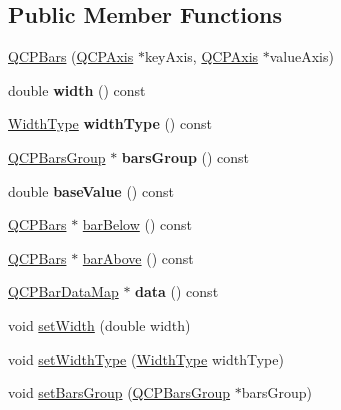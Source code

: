 \subsection*{Public Member Functions}
\begin{DoxyCompactItemize}
\item 
\hyperlink{class_q_c_p_bars_a64006999ad9dff308f40df41cef176ad}{Q\+C\+P\+Bars} (\hyperlink{class_q_c_p_axis}{Q\+C\+P\+Axis} $\ast$key\+Axis, \hyperlink{class_q_c_p_axis}{Q\+C\+P\+Axis} $\ast$value\+Axis)
\item 
\hypertarget{class_q_c_p_bars_abe7eb3987d8711f45829db879aee2280}{}\label{class_q_c_p_bars_abe7eb3987d8711f45829db879aee2280} 
double {\bfseries width} () const
\item 
\hypertarget{class_q_c_p_bars_a4c103fb405a45f47853e0345f0c6e708}{}\label{class_q_c_p_bars_a4c103fb405a45f47853e0345f0c6e708} 
\hyperlink{class_q_c_p_bars_a65dbbf1ab41cbe993d71521096ed4649}{Width\+Type} {\bfseries width\+Type} () const
\item 
\hypertarget{class_q_c_p_bars_a5eef59840b68d205df4e0c3df5f97633}{}\label{class_q_c_p_bars_a5eef59840b68d205df4e0c3df5f97633} 
\hyperlink{class_q_c_p_bars_group}{Q\+C\+P\+Bars\+Group} $\ast$ {\bfseries bars\+Group} () const
\item 
\hypertarget{class_q_c_p_bars_a29a7b3b86f80b2a04bd1f9ec0ebaf422}{}\label{class_q_c_p_bars_a29a7b3b86f80b2a04bd1f9ec0ebaf422} 
double {\bfseries base\+Value} () const
\item 
\hyperlink{class_q_c_p_bars}{Q\+C\+P\+Bars} $\ast$ \hyperlink{class_q_c_p_bars_a1b58664864b141f45e02044a855b3213}{bar\+Below} () const
\item 
\hyperlink{class_q_c_p_bars}{Q\+C\+P\+Bars} $\ast$ \hyperlink{class_q_c_p_bars_ab97f2acd9f6cb40d2cc3c33d278f0e78}{bar\+Above} () const
\item 
\hypertarget{class_q_c_p_bars_a185bcee5f2d96fbc336a2d270687d016}{}\label{class_q_c_p_bars_a185bcee5f2d96fbc336a2d270687d016} 
\hyperlink{qcustomplot_8h_aa846c77472cae93def9f1609d0c57191}{Q\+C\+P\+Bar\+Data\+Map} $\ast$ {\bfseries data} () const
\item 
void \hyperlink{class_q_c_p_bars_afec6116579d44d5b706e0fa5e5332507}{set\+Width} (double width)
\item 
void \hyperlink{class_q_c_p_bars_adcaa3b41281bb2c0f7949b341592fcc0}{set\+Width\+Type} (\hyperlink{class_q_c_p_bars_a65dbbf1ab41cbe993d71521096ed4649}{Width\+Type} width\+Type)
\item 
void \hyperlink{class_q_c_p_bars_aedd1709061f0b307c47ddb45e172ef9a}{set\+Bars\+Group} (\hyperlink{class_q_c_p_bars_group}{Q\+C\+P\+Bars\+Group} $\ast$bars\+Group)

\end{DoxyCompactItemize}
